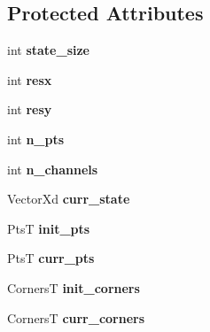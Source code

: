 \subsection*{Protected Attributes}
\begin{DoxyCompactItemize}
\item 
\hypertarget{classStateSpaceModel_a73540d40278ee80bbbba8a3a70c7ba7d}{int {\bfseries state\-\_\-size}}\label{classStateSpaceModel_a73540d40278ee80bbbba8a3a70c7ba7d}

\item 
\hypertarget{classStateSpaceModel_a35161e66eda46a3dd60dd78232e34799}{int {\bfseries resx}}\label{classStateSpaceModel_a35161e66eda46a3dd60dd78232e34799}

\item 
\hypertarget{classStateSpaceModel_a55fb756ff584214bb5f5649bd7d57b37}{int {\bfseries resy}}\label{classStateSpaceModel_a55fb756ff584214bb5f5649bd7d57b37}

\item 
\hypertarget{classStateSpaceModel_af284b51bf1e5ab79f034c3fe550f863d}{int {\bfseries n\-\_\-pts}}\label{classStateSpaceModel_af284b51bf1e5ab79f034c3fe550f863d}

\item 
\hypertarget{classStateSpaceModel_ab9d3d2e904655e3072cf7559beb3cdef}{int {\bfseries n\-\_\-channels}}\label{classStateSpaceModel_ab9d3d2e904655e3072cf7559beb3cdef}

\item 
\hypertarget{classStateSpaceModel_ac19b8d6fbf8f37adcf84d8a9d82b9cfa}{Vector\-Xd {\bfseries curr\-\_\-state}}\label{classStateSpaceModel_ac19b8d6fbf8f37adcf84d8a9d82b9cfa}

\item 
\hypertarget{classStateSpaceModel_a29ee5155ee72930489962176857efcb2}{Pts\-T {\bfseries init\-\_\-pts}}\label{classStateSpaceModel_a29ee5155ee72930489962176857efcb2}

\item 
\hypertarget{classStateSpaceModel_ad935ddcadfaad4aa6c8f464199b11066}{Pts\-T {\bfseries curr\-\_\-pts}}\label{classStateSpaceModel_ad935ddcadfaad4aa6c8f464199b11066}

\item 
\hypertarget{classStateSpaceModel_a9c9009c2534834d1a5dbcd1901d8d2d9}{Corners\-T {\bfseries init\-\_\-corners}}\label{classStateSpaceModel_a9c9009c2534834d1a5dbcd1901d8d2d9}

\item 
\hypertarget{classStateSpaceModel_a76b9ea7f94ff2d8178fd4e7faaf77bcc}{Corners\-T {\bfseries curr\-\_\-corners}}\label{classStateSpaceModel_a76b9ea7f94ff2d8178fd4e7faaf77bcc}


\end{DoxyCompactItemize}
